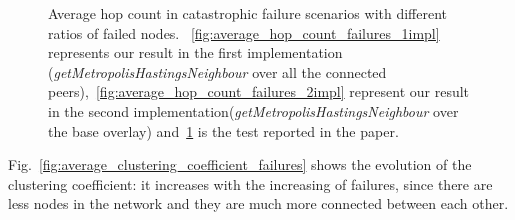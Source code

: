 \begin{figure}
\begin{subfigure}{.5\textwidth}
  \caption{}
  \label{fig:paper_average_hop_count_failures}
\end{subfigure}
\caption{Average hop count in catastrophic failure scenarios with different ratios of failed nodes. ~\ref{fig:average_hop_count_failures_1impl} represents our result in the first implementation (\textit{getMetropolisHastingsNeighbour} over all the connected peers),~\ref{fig:average_hop_count_failures_2impl} represent our result in the second implementation(\textit{getMetropolisHastingsNeighbour} over the base overlay) and~\ref{fig:paper_average_hop_count_failures} is the test reported in the paper.}
\label{fig:robustness_hop_count_failures}
\end{figure}

Fig.~\ref{fig:average_clustering_coefficient_failures} shows the evolution of the clustering coefficient: it increases with the increasing of failures, since there are less nodes in the network and they are much more connected between each other. 


